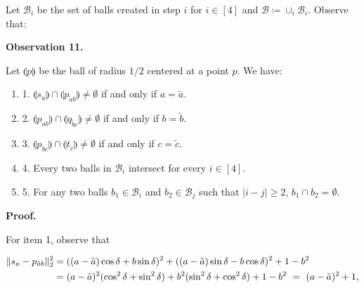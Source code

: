 \documentclass[10pt,a4paper]{article}
\begin{document}
Let $\mathcal{B}_{i}$ be the set of balls created in step $i$ for $i\in[4]$ and $\mathcal{B}\coloneqq\cup_{i}\mathcal{B}_{i}$. Observe that:
\par
\par
\par\medskip\noindent\textbf{Observation 11.}\par
Let $\llparenthesis p\rrparenthesis$ be the ball of radius $1/2$ centered at a point $p$. We have:
\par
\begin{enumerate}
\item[]  1. 
$\llparenthesis s_{a}\rrparenthesis\cap\llparenthesis p_{\tilde{a}b}%
\rrparenthesis\not=\emptyset$ if and only if $a=\tilde{a}$.
\par
\par
\item[]  2. 
$\llparenthesis p_{ab}\rrparenthesis\cap\llparenthesis q_{\tilde{b}c}%
\rrparenthesis\not=\emptyset$ if and only if $b=\tilde{b}$.
\par
\par
\item[]  3. 
$\llparenthesis p_{bc}\rrparenthesis\cap\llparenthesis t_{\tilde{c}}%
\rrparenthesis\not=\emptyset$ if and only if $c=\tilde{c}$.
\par
\par
\item[]  4. 
Every two balls in $\mathcal{B}_{i}$ intersect for every $i\in[4]$.
\par
\par
\item[]  5. 
For any two balls $b_{1}\in\mathcal{B}_{i}$ and $b_{2}\in\mathcal{B}_{j}$ such that $|i-j|\geq 2$, $b_{1}\cap b_{2}=\emptyset$.
\par
\par
\end{enumerate}
\par
\par
\par\medskip\noindent\textbf{Proof.}\par
For item 1, observe that
\par
\[\begin{aligned}
\begin{split}\|s_{a}-p_{\tilde{a}b}\|^{2}_{2}&=((a-\tilde{a})\cos\delta+b\sin%
\delta)^{2}+((a-\tilde{a})\sin\delta-b\cos\delta)^{2}+1-b^{2}\\
&=(a-\tilde{a})^{2}(\cos^{2}\delta+\sin^{2}\delta)+b^{2}(\sin^{2}\delta+\cos^{%
2}\delta)+1-b^{2}\nobreak\ =\nobreak\ (a-\tilde{a})^{2}+1,\end{split}
\end{aligned}\]
\end{document}
